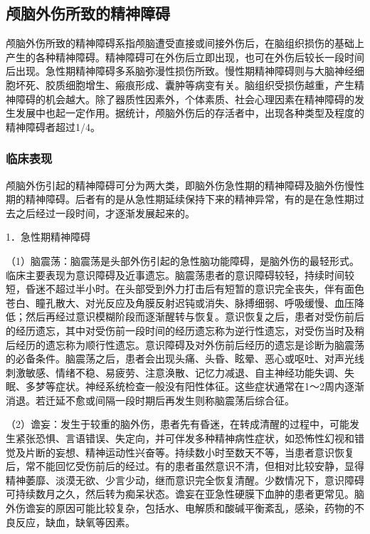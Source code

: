 \subsection{颅脑外伤所致的精神障碍}

颅脑外伤所致的精神障碍系指颅脑遭受直接或间接外伤后，在脑组织损伤的基础上产生的各种精神障碍。精神障碍可在外伤后立即出现，也可在外伤后较长一段时间后出现。急性期精神障碍多系脑弥漫性损伤所致。慢性期精神障碍则与大脑神经细胞坏死、胶质细胞增生、瘢痕形成、囊肿等病变有关。脑组织受损伤越重，产生精神障碍的机会越大。除了器质性因素外，个体素质、社会心理因素在精神障碍的发生发展中也起一定作用。据统计，颅脑外伤后的存活者中，出现各种类型及程度的精神障碍者超过1/4。

\subsubsection{临床表现}

颅脑外伤引起的精神障碍可分为两大类，即脑外伤急性期的精神障碍及脑外伤慢性期的精神障碍。后者有的是从急性期延续保持下来的精神异常，有的是在急性期过去之后经过一段时间，才逐渐发展起来的。

1．急性期精神障碍

（1）脑震荡：脑震荡是头部外伤引起的急性脑功能障碍，是脑外伤的最轻形式。临床主要表现为意识障碍及近事遗忘。脑震荡患者的意识障碍较轻，持续时间较短，昏迷不超过半小时。在头部受到外力打击后有短暂的意识完全丧失，伴有面色苍白、瞳孔散大、对光反应及角膜反射迟钝或消失、脉搏细弱、呼吸缓慢、血压降低；然后再经过意识模糊阶段而逐渐醒转与恢复。意识恢复之后，患者对受伤前后的经历遗忘，其中对受伤前一段时间的经历遗忘称为逆行性遗忘，对受伤当时及稍后经历的遗忘称为顺行性遗忘。意识障碍及对外伤前后经历的遗忘是诊断为脑震荡的必备条件。脑震荡之后，患者会出现头痛、头昏、眩晕、恶心或呕吐、对声光线刺激敏感、情绪不稳、易疲劳、注意涣散、记忆力减退、自主神经功能失调、失眠、多梦等症状。神经系统检查一般没有阳性体征。这些症状通常在1～2周内逐渐消退。若迁延不愈或间隔一段时期后再发生则称脑震荡后综合征。

（2）谵妄：发生于较重的脑外伤，患者先有昏迷，在转成清醒的过程中，可能发生紧张恐惧、言语错误、失定向，并可伴发多种精神病性症状，如恐怖性幻视和错觉及片断的妄想、精神运动性兴奋等。持续数小时至数天不等，当患者意识恢复后，常不能回忆受伤前后的经过。有的患者虽然意识不清，但相对比较安静，显得精神萎靡、淡漠无欲、少言少动，继而意识完全恢复清醒。少数情况下，意识障碍可持续数月之久，然后转为痴呆状态。谵妄在亚急性硬膜下血肿的患者更常见。脑外伤谵妄的原因可能比较复杂，包括水、电解质和酸碱平衡紊乱，感染，药物的不良反应，缺血，缺氧等因素。

